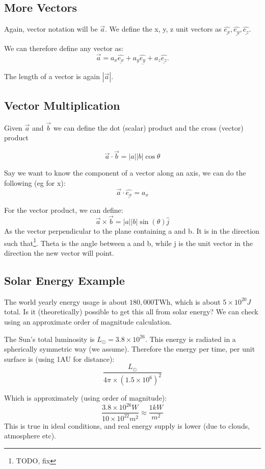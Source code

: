 \subsection*{More Vectors}
Again, vector notation will be $\vec{a}$. We define the x, y, z unit vectors as $\underline{\hat{e_x}}, \underline{\hat{e_y}}, \underline{\hat{e_z}}$.

We can therefore define any vector as:
\[
    \vec{a} = a_x \underline{\hat{e_x}} + a_y \underline{\hat{e_y}} + a_z\underline{\hat{e_z}}.
\]

The length of a vector is again $|\vec{a}|$.

\subsection*{Vector Multiplication}
Given $\vec{a}$ and $\vec{b}$ we can define the dot (scalar) product and the cross (vector) product

\[
    \vec{a} \cdot \vec{b} = |a||b| \cos \theta
\]

Say we want to know the component of a vector along an axis, we can do the following (eg for x):
\[
    \vec{a} \cdot \underline{\hat{e_x}} = a_x
\]

For the vector product, we can define:
\[
    \vec{a} \times \vec{b} = |a||b| \sin(\theta) \hat{j}
\]
As the vector perpendicular to the plane containing a and b. It is in the direction such that\footnote{TODO, fix}. Theta is the angle between a and b, while j is the unit vector in the direction the new vector will point.

\subsection*{Solar Energy Example}
The world yearly energy usage is about $180,000 \text{TWh}$, which is about $5 \times 10^{20}J$ total. Is it (theoretically) possible to get this all from solar energy? We can check using an approximate order of magnitude calculation.

The Sun's total luminosity is $L_{\odot} = 3.8 \times 10^{26}$. This energy is radiated in a spherically symmetric way (we assume). Therefore the energy per time, per unit surface is (using 1AU for distance):
\[
    \frac{L_{\odot}}{4\pi \times (1.5 \times 10^6)^2}
\]

Which is approximately (using order of magnitude):
\[
    \frac{3.8 \times 10^{26}W}{10 \times 10^{22}m^2} \approx \frac{1kW}{m^2}
\]
This is true in ideal conditions, and real energy supply is lower (due to clouds, atmosphere etc). 

